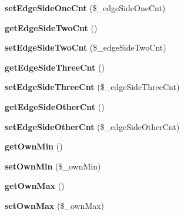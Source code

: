 \begin{DoxyCompactItemize}
\item 
\mbox{\label{class_reversi_anz_ad127ab3ba9b82be673950d183347c85e}} 
{\bfseries set\+Edge\+Side\+One\+Cnt} (\$\+\_\+edge\+Side\+One\+Cnt)
\item 
\mbox{\label{class_reversi_anz_a94d3fa39f3752df50f020a778e0c48a4}} 
{\bfseries get\+Edge\+Side\+Two\+Cnt} ()
\item 
\mbox{\label{class_reversi_anz_a4746c6d3580ede0a67a4d254a7f62bee}} 
{\bfseries set\+Edge\+Side\+Two\+Cnt} (\$\+\_\+edge\+Side\+Two\+Cnt)
\item 
\mbox{\label{class_reversi_anz_ae26a95d517a16d416be4126522fb532f}} 
{\bfseries get\+Edge\+Side\+Three\+Cnt} ()
\item 
\mbox{\label{class_reversi_anz_ac42ae43a9931dd7765f5650cf2881f3f}} 
{\bfseries set\+Edge\+Side\+Three\+Cnt} (\$\+\_\+edge\+Side\+Three\+Cnt)
\item 
\mbox{\label{class_reversi_anz_a7b064999c75b33d3dafd636885a30660}} 
{\bfseries get\+Edge\+Side\+Other\+Cnt} ()
\item 
\mbox{\label{class_reversi_anz_ad7d598abd2e505884b4e405505c81cdf}} 
{\bfseries set\+Edge\+Side\+Other\+Cnt} (\$\+\_\+edge\+Side\+Other\+Cnt)
\item 
\mbox{\label{class_reversi_anz_a52453994039cc16cd883b615580bd678}} 
{\bfseries get\+Own\+Min} ()
\item 
\mbox{\label{class_reversi_anz_aba52773abcdb9adc2b222977153c6a91}} 
{\bfseries set\+Own\+Min} (\$\+\_\+own\+Min)
\item 
\mbox{\label{class_reversi_anz_ae8b22c114dd706252d7ac65db730c4bd}} 
{\bfseries get\+Own\+Max} ()
\item 
\mbox{\label{class_reversi_anz_a0e115c41bc381831f3f1e19c3214eba7}} 
{\bfseries set\+Own\+Max} (\$\+\_\+own\+Max)
\item 
\mbox{\label{class_reversi_anz_a7dc0022c2e3015837f9443887fa970a1}} 

\end{DoxyCompactItemize}
